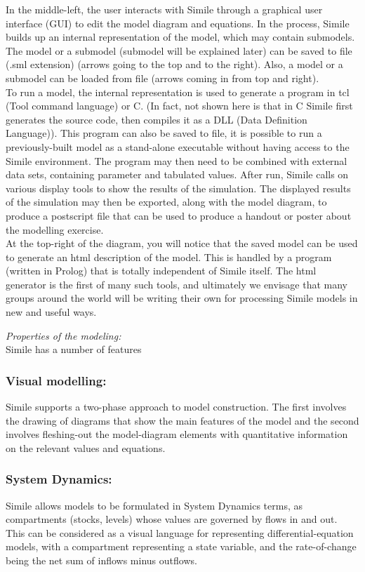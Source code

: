 In the middle-left, the user interacts with Simile through a graphical user interface (GUI) to edit the model diagram and equations. In the process, Simile builds up an internal representation of the model, which may contain submodels. The model or a submodel 
(submodel will be explained later) can be saved to file (.sml extension) (arrows going to the top and to the right). Also, a model or a submodel can be loaded from file (arrows coming in from top and right).\\
To run a model, the internal representation is used to generate a program in tcl (Tool command language) or C. (In fact, not shown here is that in C Simile first generates the source code, then compiles it as a DLL (Data Definition Language)). This program can also be saved to file, it is possible to run a previously-built model as a stand-alone executable without having access to the Simile environment. The program may then need to be combined with external data sets, containing parameter and tabulated values. After run, Simile calls on various display tools to show the results of the simulation. The displayed results of the simulation may then be exported, along with the model diagram, to produce a postscript file that can be used to produce a handout or poster about the modelling exercise.\\
At the top-right of the diagram, you will notice that the saved model can be used to generate an html description of the model. This is handled by a program (written in Prolog) that is totally independent of Simile itself. The html generator is the first of many such tools, and ultimately we envisage that many groups around the world will be writing their own for processing Simile models in new and useful ways.

\emph{Properties of the modeling:}\\
Simile has a number of features
	\subsubsection{Visual modelling:}
Simile supports a two-phase approach to model construction. The first involves the drawing of diagrams that show the main features of the model and the second involves fleshing-out the model-diagram elements with quantitative information on the relevant values and equations.
	\subsubsection{System Dynamics:}
Simile allows models to be formulated in System Dynamics terms, as compartments (stocks, levels) whose values are governed by flows in and out. This can be considered as a visual language for representing differential-equation models, with a compartment representing a state variable, and the rate-of-change being the net sum of inflows minus outflows.
